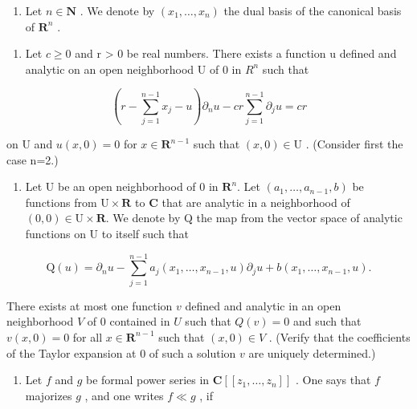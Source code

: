 \begin{enumerate}
\def\labelenumi{\arabic{enumi})}
\setcounter{enumi}{29}
\tightlist
\item
  Let \(n \in \mathbf{N}\) . We denote by \((x_1, \ldots, x_n)\) the dual basis of the canonical basis of \(\mathbf{R}^n\) .
\end{enumerate}

\begin{enumerate}
\def\labelenumi{\alph{enumi})}
\tightlist
\item
  Let \(c \geqslant 0\) and r \textgreater{} 0 be real numbers. There exists a function u defined and analytic on an open neighborhood U of 0 in \(R^{n}\) such that
\end{enumerate}

\[
\left(r - \sum_ {j = 1} ^ {n - 1} x _ {j} - u\right) \partial_ {n} u - c r \sum_ {j = 1} ^ {n - 1} \partial_ {j} u = c r
\]

on U and \(u(x,0)=0\) for \(x\in\mathbf{R}^{n-1}\) such that \((x,0)\in\mathrm{U}\) . (Consider first the case n=2.)

\begin{enumerate}
\def\labelenumi{\alph{enumi})}
\setcounter{enumi}{1}
\tightlist
\item
  Let U be an open neighborhood of 0 in \(\mathbf{R}^{n}\). Let \((a_{1},\ldots,a_{n-1},b)\) be functions from \(\mathrm{U}\times\mathbf{R}\) to \(\mathbf{C}\) that are analytic in a neighborhood of \((0,0)\in\mathrm{U}\times\mathbf{R}\). We denote by Q the map from the vector space of analytic functions on U to itself such that
\end{enumerate}

\[
\mathrm{Q} (u) = \partial_ {n} u - \sum_ {j = 1} ^ {n - 1} a _ {j} (x _ {1}, \dots , x _ {n - 1}, u) \partial_ {j} u + b (x _ {1}, \dots , x _ {n - 1}, u).
\]

There exists at most one function \(v\) defined and analytic in an open neighborhood \(V\) of 0 contained in \(U\) such that \(Q(v) = 0\) and such that \(v(x,0) = 0\) for all \(x \in \mathbf{R}^{n-1}\) such that \((x,0) \in V\) . (Verify that the coefficients of the Taylor expansion at 0 of such a solution \(v\) are uniquely determined.)

\begin{enumerate}
\def\labelenumi{\alph{enumi})}
\setcounter{enumi}{2}
\tightlist
\item
  Let \(f\) and \(g\) be formal power series in \(\mathbf{C}[[z_1, \ldots, z_n]]\) . One says that \(f\) majorizes \(g\) , and one writes \(f \ll g\) , if
\end{enumerate}


